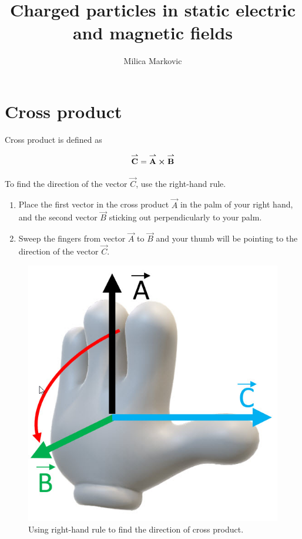 \documentclass{ximera}
\title{Charged particles in static electric and magnetic fields}
\author{Milica Markovic}
\begin{document}
  
\begin{abstract}  

\end{abstract}  
\maketitle    




\section{Cross product}

Cross product is defined as

\begin{equation}
{\overset{\boldsymbol{\rightharpoonup}}{\mathbf{C}}}\hspace{0in}={\overset{\boldsymbol{\rightharpoonup}}{\mathbf{A}}}\hspace{0in} \boldsymbol\times {\overset{\boldsymbol{\rightharpoonup}}{\mathbf{B}}}\hspace{0in}
\end{equation}

To find the direction of the vector $\vec{C}$, use the right-hand rule.
\begin{enumerate}
\item Place the first vector in the cross product $\vec{A}$ in the palm of your right hand, and the second vector $\vec{B}$ sticking out perpendicularly to your palm.
\item Sweep the fingers from vector $\vec{A}$ to $\vec{B}$ and your thumb will be pointing to the direction of the vector $\vec{C}$.
\end{enumerate}

\begin{figure}[htbp]
\begin{center}
\includegraphics[scale=0.5]{../jpg/RHR.jpg}
\end{center}
\caption{Using right-hand rule to find the direction of cross product. }
\label{fig:crossProduct}
\end{figure}
\end{document}
